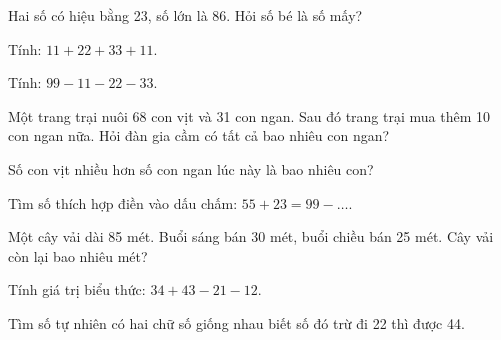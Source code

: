 \begin{ex}
Hai số có hiệu bằng 23, số lớn là 86. Hỏi số bé là số mấy?
\end{ex}

\begin{ex}
Tính: $11 + 22 + 33 + 11$.
\end{ex}

\begin{ex}
Tính: $99 - 11 - 22 - 33$.
\end{ex}

\begin{ex}
Một trang trại nuôi 68 con vịt và 31 con ngan. Sau đó trang trại mua thêm 10 con ngan nữa. Hỏi đàn gia cầm có tất cả bao nhiêu con ngan?
\end{ex}

\begin{ex}
Số con vịt nhiều hơn số con ngan lúc này là bao nhiêu con?
\end{ex}

\begin{ex}
Tìm số thích hợp điền vào dấu chấm: $55 + 23 = 99 - \dots$.
\end{ex}

\begin{ex}
Một cây vải dài 85 mét. Buổi sáng bán 30 mét, buổi chiều bán 25 mét. Cây vải còn lại bao nhiêu mét?
\end{ex}

\begin{ex}
Tính giá trị biểu thức: $34 + 43 - 21 - 12$.
\end{ex}

\begin{ex}
Tìm số tự nhiên có hai chữ số giống nhau biết số đó trừ đi 22 thì được 44.
\end{ex}
